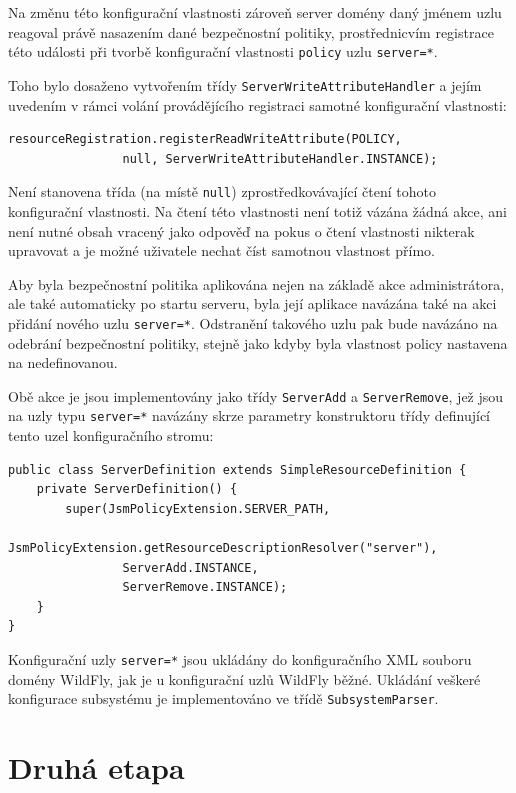 Na změnu této konfigurační vlastnosti zároveň server domény daný jménem uzlu reagoval právě nasazením dané bezpečnostní politiky, prostřednicvím registrace této události při tvorbě konfigurační vlastnosti {\tt policy} uzlu {\tt server=*}.

Toho bylo dosaženo vytvořením třídy {\tt ServerWriteAttributeHandler} a jejím uvedením v rámci volání provádějícího registraci samotné konfigurační vlastnosti:

\begin{verbatim}
resourceRegistration.registerReadWriteAttribute(POLICY,
                null, ServerWriteAttributeHandler.INSTANCE);
\end{verbatim}

Není stanovena třída (na místě {\tt null}) zprostředkovávající čtení tohoto konfigurační vlastnosti. Na čtení této vlastnosti není totiž vázána žádná akce, ani není nutné obsah vracený jako odpověď na pokus o čtení vlastnosti nikterak upravovat a je možné uživatele nechat číst samotnou vlastnost přímo.

Aby byla bezpečnostní politika aplikována nejen na základě akce administrátora, ale také automaticky po startu serveru, byla její aplikace navázána také na akci přidání nového uzlu {\tt server=*}. Odstranění takového uzlu pak bude navázáno na odebrání bezpečnostní politiky, stejně jako kdyby byla vlastnost policy nastavena na nedefinovanou.

Obě akce je jsou implementovány jako třídy {\tt ServerAdd} a {\tt ServerRemove}, jež jsou na uzly typu {\tt server=*} navázány skrze parametry konstruktoru třídy definující tento uzel konfiguračního stromu:

\begin{verbatim}
public class ServerDefinition extends SimpleResourceDefinition {
    private ServerDefinition() {
        super(JsmPolicyExtension.SERVER_PATH,
                JsmPolicyExtension.getResourceDescriptionResolver("server"),
                ServerAdd.INSTANCE,
                ServerRemove.INSTANCE);
    }
}
\end{verbatim}

Konfigurační uzly {\tt server=*} jsou ukládány do konfiguračního XML souboru domény WildFly, jak je u konfigurační uzlů WildFly běžné. Ukládání veškeré konfigurace subsystému je implementováno ve třídě {\tt SubsystemParser}.

\section{Druhá etapa}

